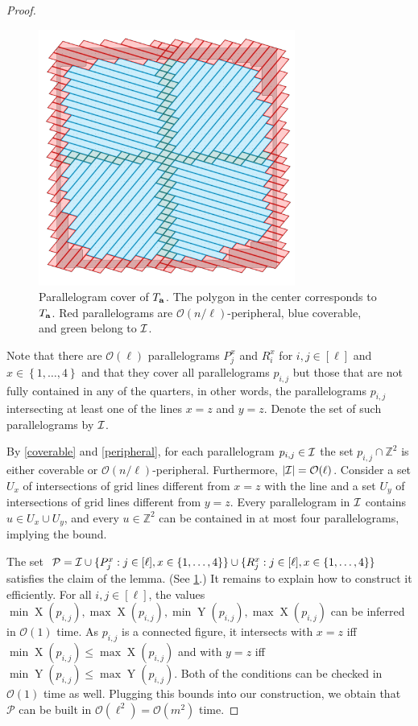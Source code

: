 \documentclass[twoside,leqno]{article}
\newcommand{\Z}{\mathbb{Z}}
\renewcommand{\O}{\mathcal{O}}
\newcommand{\set}[1]{\left\lbrace #1 \right\rbrace}
\DeclareMathOperator*{\X}{X}
\DeclareMathOperator*{\Y}{Y}
\newcommand{\absolute}[1]{\left\lvert#1\right\rvert}
\begin{document}
\begin{proof}
\begin{figure}[h!]
        \centering
        \includegraphics[width=0.75\textwidth]{drawings/text_decomposition}
        \caption{Parallelogram cover of $T_\mathbf{a}$. The polygon in the center corresponds to $T_\mathbf{a}$. Red parallelograms are $\O(n/\ell)$-peripheral, blue coverable, and green belong to $\mathcal{I}$.}
        \label{figure:text_decomposition}
\end{figure}

Note that there are $\O(\ell)$ parallelograms $P_j^x$ and $R_i^x$ for $i,j \in [\ell]$ and $x \in \set{1, \dots, 4}$ and that they cover all parallelograms $p_{i,j}$ but those that are not fully contained in any of the quarters, in other words, the parallelograms $p_{i, j}$ intersecting  at least one of the lines $x = z$ and $y = z$. Denote the set of such parallelograms by $\mathcal{I}$. 

By \cref{coverable} and \cref{peripheral}, for each parallelogram $p_{i,j} \in \mathcal{I}$ the set $p_{i,j} \cap \Z^2$ is either coverable or $\O(n/\ell)$-peripheral. Furthermore, $\absolute{\I} = \O(\ell)$. Consider a set $U_x$ of intersections of grid lines different from $x=z$ with the line and a set $U_y$ of intersections of grid lines different from $y=z$. Every parallelogram in $\mathcal{I}$ contains $u \in U_x \cup U_y$, and every $u \in \Z^2$ can be contained in at most four parallelograms, implying the bound. 

The set $\mathcal{P} = \mathcal{I} \cup \{P_j^x : j \in [\ell], x \in \{1, \dots, 4\}\} \cup \{R_j^x : j \in [\ell], x \in \{1, \dots, 4\}\}$ satisfies the claim of the lemma. (See \cref{figure:text_decomposition}.) It remains to explain how to construct it efficiently. For all $i,j \in [\ell]$, the values $\min \X(p_{i,j}), \max \X(p_{i,j}), \min \Y(p_{i,j}), \max \X(p_{i,j})$ can be inferred in $\O(1)$ time. As $p_{i,j}$ is a connected figure, it intersects with $x = z$ iff $\min \X(p_{i,j}) \le \max \X(p_{i,j})$ and with $y = z$ iff $\min \Y(p_{i,j}) \le \max \Y(p_{i,j})$. Both of the conditions can be checked in $\O(1)$ time as well. Plugging this bounds into our construction, we obtain that $\mathcal{P}$ can be built in $\O(\ell^2) = \O(m^2)$ time. 
\end{proof}
\end{document}
